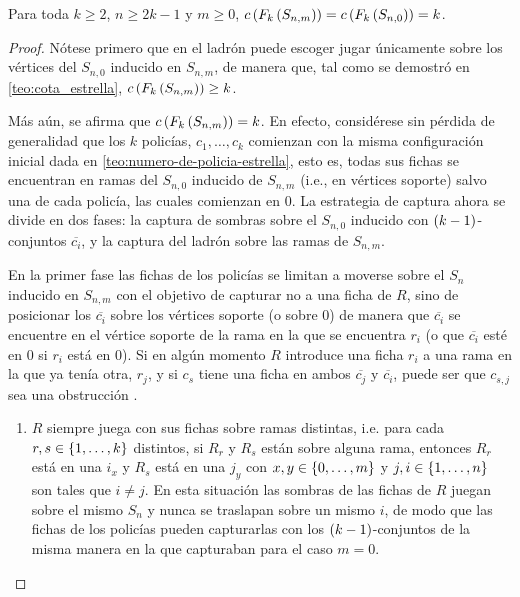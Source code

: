 
\begin{teorema}
\label{teo:numero-de-policia-estrella-subdivisiones}
    Para toda $k\geq 2$, $n\geq 2k-1$ y $m\geq 0$,
    $c\left( F_{k}\left( S_{n,m}\right)\right)=c\left( F_{k}\left( S_{n,0}\right)\right)=k$.
\end{teorema}
\begin{proof}
    N\'otese primero que en  el ladr\'on puede escoger jugar
    \'unicamente sobre los v\'ertices del $S_{n,0}$ inducido
    en $S_{n,m}$, de manera que, tal como se demostr\'o en
    \cref{teo:cota_estrella}, $c\left( F_{k}\left( S_{n,m}\right)\right)\geq
    k$.

    M\'as a\'un, se afirma que $c\left( F_{k}\left( S_{n,m}\right)\right) = k$. En efecto,
    consid\'erese sin p\'erdida de generalidad que los $k$ polic\'ias,
    $c_1,\dots, c_k$ comienzan con la misma configuraci\'on inicial dada en
    \cref{teo:numero-de-policia-estrella}, esto es, todas sus fichas se
    encuentran en ramas del $S_{n,0}$ inducido de $S_{n,m}$ (i.e., en v\'ertices
    soporte) salvo una de cada polic\'ia, las cuales comienzan en $0$. La
    estrategia de captura ahora se divide en dos fases: la captura de sombras
    sobre el $S_{n,0}$ inducido con $\left( k-1\right)$-conjuntos $\overline{c_i}$, y
    la captura del ladr\'on sobre las ramas de $S_{n,m}$.

    En la primer fase las fichas de los polic\'ias se limitan a moverse sobre el
    $S_n$ inducido en $S_{n,m}$ con el objetivo de capturar no a una ficha de
    $R$, sino de posicionar los $\overline{c_i}$ sobre los v\'ertices soporte (o
    sobre $0$) de manera que $\overline{c_i}$ se encuentre en el v\'ertice
    soporte de la rama en la que se encuentra $r_i$ (o que $\overline{c_i}$
    est\'e en $0$ si $r_i$ est\'a en $0$). Si en alg\'un momento $R$ introduce
    una ficha $r_i$ a una rama en la que ya ten\'ia otra, $r_j$, y si $c_{s}$
    tiene una ficha en ambos $\overline{c_j}$ y $\overline{c_i}$, puede ser que
    $c_{s,j}$ sea una obstrucci\'on .
        \begin{enumerate}
            \item $R$ siempre juega con sus fichas sobre ramas distintas, i.e.
            para cada $r,s\in \{1,\dots, k\}$ distintos, si $R_r$ y $R_s$ est\'an
            sobre alguna rama, entonces $R_r$ est\'a en una $i_{x}$ y $R_s$
            est\'a en una $j_{y}$ con $x,y\in \{0,\dots, m\}$ y $j,i\in \{1,\dots, n\}$
            son tales que $i\neq j$. En esta situaci\'on las sombras de las
            fichas de $R$ juegan sobre el mismo $S_n$ y nunca se traslapan sobre
            un mismo $i$, de modo que las fichas de los polic\'ias pueden
            capturarlas con los $\left( k-1\right)$-conjuntos de la misma manera en la
            que capturaban para el caso $m=0$.
            

\end{enumerate}
\end{proof}
